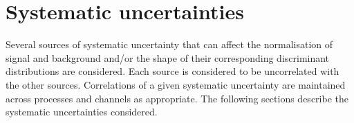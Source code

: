 \section{Systematic uncertainties}
\label{sec:systematics}
				   
Several sources of systematic uncertainty that can affect the normalisation of signal 
and background and/or the shape of their corresponding discriminant distributions are considered.
Each source is considered to be uncorrelated with the other sources.  
Correlations of a given systematic uncertainty are maintained across processes and channels 
as appropriate.
The following sections describe the systematic uncertainties considered.

